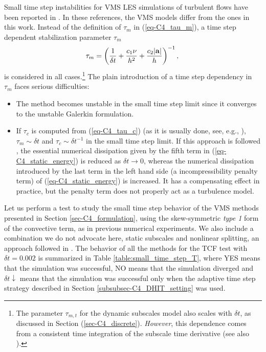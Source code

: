 Small time step instabilities for VMS LES simulations of turbulent flows have been reported in \cite{Hsu2010,gamnitzer_time-dependent_2010}. In these references, the VMS models differ from the ones in this work. Instead of the definition of  $\tau_m$ in (\ref{eq-C4_tau_m}), a time step dependent stabilization parameter $\tau_m$
$$
\tau_m=\left(\frac{1}{\delta t} + \frac{c_1\nu}{h^2}+\frac{c_2|{\bf a}|}{h}\right)^{-1},\\
$$
is considered in all cases.\footnote{The parameter $\tau_{m,t}$ for the dynamic subscales model also
scales with $\delta t$, as discussed in Section (\ref{sec-C4_discrete}). {\it However}, this dependence comes from a consistent time integration of the subscale time derivative (see also \cite[Section 3.2]{codina_time_2007}).} The plain introduction of a time step dependency in $\tau_m$ faces serious difficulties:
\begin{itemize}
\item The method becomes unstable in the small time step limit since it converges to the unstable Galerkin formulation.
\item If $\tau_c$ is computed from (\ref{eq-C4_tau_c}) (as it is usually done, see, e.g., \cite{bazilevs_variational_2007,Hsu2010,gamnitzer_time-dependent_2010,gravemeier_algebraic_2010}), $\tau_m \sim \delta t$ and $\tau_c \sim \delta t^{-1}$ in the small time step limit. If this approach is followed , the essential numerical dissipation given by the fifth term in (\ref{eq-C4_static_energy}) is reduced as $\delta t \to 0$, whereas the numerical dissipation introduced by the last term in the left hand side (a incompressibility penalty term) of (\ref{eq-C4_static_energy}) is increased. It has a compensating effect in practice, but the penalty term does not properly act as a turbulence model. %
\end{itemize}

Let us perform a test to study the small time step behavior of the VMS methods presented in Section \ref{sec-C4_formulation}, using the skew-symmetric \textit{type 1} form of the convective term, as in previous numerical experiments. We also include a combination we do not advocate here, static subscales and nonlinear splitting, an approach followed in \cite{Calo_2004,bazilevs_variational_2007,Hsu2010,gamnitzer_time-dependent_2010,gravemeier_algebraic_2010}. %
The behavior of all the methods for the TCF test with $\delta t=0.002$ is summarized in Table \ref{table:small_time_step_T}, where YES means that the simulation was successful, NO means that the simulation diverged and $\delta t\downarrow$ means that the simulation was successful only when the adaptive time step strategy described in Section \ref{subsubsec-C4_DHIT_setting} was used.

